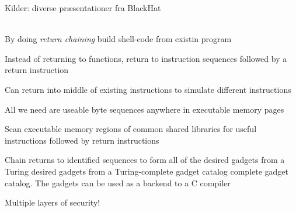 \documentclass[Screen16to9,17pt]{foils}
\begin{document}
Kilder: diverse præsentationer fra BlackHat\\
\\
{\footnotesize{}}



\begin{list2}
\item By doing \emph{return chaining} build shell-code from existin program
\item Instead of returning to
functions, return to
instruction sequences
followed by a return
instruction

\item Can return into middle of
existing instructions to
simulate different
instructions

\item All we need are useable
byte sequences anywhere
in executable memory
pages
\item Scan executable memory regions of common shared
libraries for useful instructions followed by return
instructions
\item Chain returns to identified sequences to form all of the
desired gadgets from a Turing desired gadgets from
a Turing-complete gadget catalog complete gadget catalog. The gadgets can be used as a backend to a C compiler
\end{list2}

{\footnotesize{}}






\centerline{Multiple layers of security! }






\centerline{}



\end{document}
